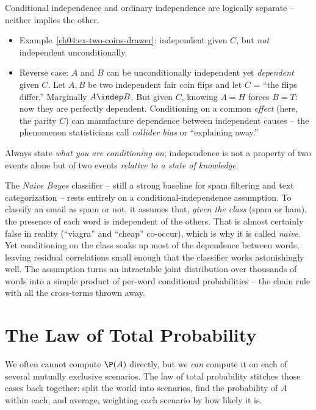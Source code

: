 \begin{trapbox}
Conditional independence and ordinary independence are logically separate -- neither implies the other.
\begin{itemize}
\item Example~\ref{ch04:ex-two-coins-drawer}: independent given $C$, but \emph{not} independent unconditionally.
\item Reverse case: $A$ and $B$ can be unconditionally independent yet \emph{dependent} given $C$. Let $A, B$ be two independent fair coin flips and let $C$ = ``the flips differ.'' Marginally $A\indep B$. But given $C$, knowing $A=H$ forces $B=T$: now they are perfectly dependent. Conditioning on a common \emph{effect} (here, the parity $C$) can manufacture dependence between independent causes -- the phenomenon statisticians call \emph{collider bias} or ``explaining away.''
\end{itemize}
Always state \emph{what you are conditioning on}; independence is not a property of two events alone but of two events \emph{relative to a state of knowledge}.
\end{trapbox}

\begin{applicationbox}
The \emph{Naive Bayes} classifier -- still a strong baseline for spam filtering and text categorization -- rests entirely on a conditional-independence assumption. To classify an email as spam or not, it assumes that, \emph{given the class} (spam or ham), the presence of each word is independent of the others. That is almost certainly false in reality (``viagra'' and ``cheap'' co-occur), which is why it is called \emph{naive}. Yet conditioning on the class soaks up most of the dependence between words, leaving residual correlations small enough that the classifier works astonishingly well. The assumption turns an intractable joint distribution over thousands of words into a simple product of per-word conditional probabilities -- the chain rule with all the cross-terms thrown away.
\end{applicationbox}

\section{The Law of Total Probability}
\label{ch04:total-prob}

We often cannot compute $\P(A)$ directly, but we \emph{can} compute it on each of several mutually exclusive scenarios. The law of total probability stitches those cases back together: split the world into scenarios, find the probability of $A$ within each, and average, weighting each scenario by how likely it is.

